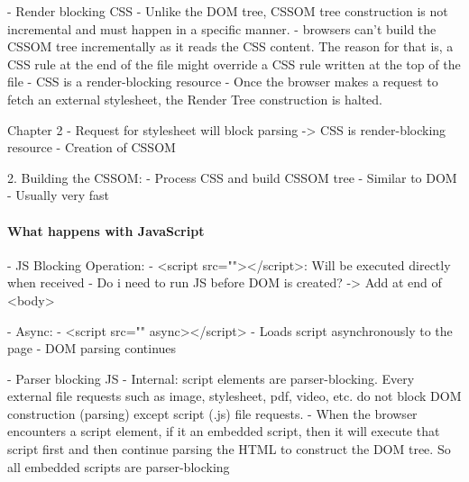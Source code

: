 - Render blocking CSS
- Unlike the DOM tree, CSSOM tree construction is not incremental and must happen in a specific manner.
- browsers can’t build the CSSOM tree incrementally as it reads the CSS content. The reason for that is, a CSS rule at the end of the file might override a CSS rule written at the top of the file
- CSS is a render-blocking resource
- Once the browser makes a request to fetch an external stylesheet, the Render Tree construction is halted.




Chapter 2
- Request for stylesheet will block parsing -> CSS is render-blocking resource
- Creation of CSSOM



2. Building the CSSOM:
- Process CSS and build CSSOM tree
- Similar to DOM
- Usually very fast











\paragraph{What happens with JavaScript}




- JS Blocking Operation:
	- <script src=""></script>: Will be executed directly when received
	- Do i need to run JS before DOM is created?
	-> Add at end of <body>

- Async:
	- <script src="" async></script>
	- Loads script asynchronously to the page
	- DOM parsing continues
	
	
	







- Parser blocking JS
- Internal: script elements are parser-blocking. Every external file requests such as image, stylesheet, pdf, video, etc. do not block DOM construction (parsing) except script (.js) file requests.
- When the browser encounters a script element, if it an embedded script, then it will execute that script first and then continue parsing the HTML to construct the DOM tree. So all embedded scripts are parser-blocking

